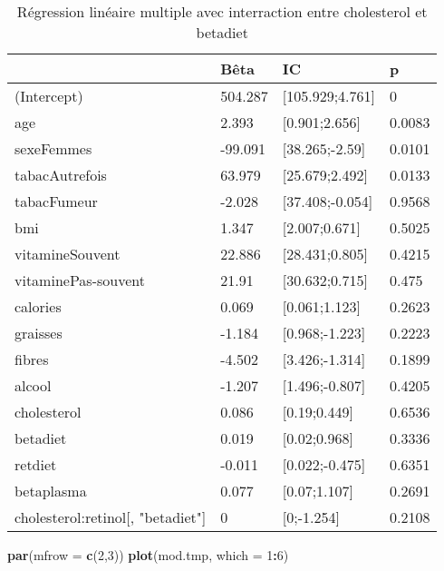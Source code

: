 \documentclass[]{article}
\newenvironment{Shaded}{\begin{snugshade}}{\end{snugshade}}
\newcommand{\KeywordTok}[1]{\textcolor[rgb]{0.13,0.29,0.53}{\textbf{#1}}}
\newcommand{\DataTypeTok}[1]{\textcolor[rgb]{0.13,0.29,0.53}{#1}}
\newcommand{\DecValTok}[1]{\textcolor[rgb]{0.00,0.00,0.81}{#1}}
\newcommand{\OperatorTok}[1]{\textcolor[rgb]{0.81,0.36,0.00}{\textbf{#1}}}
\newcommand{\NormalTok}[1]{#1}
\begin{document}
\begin{table}

\caption{\label{tab:unnamed-chunk-78}Régression linéaire multiple avec interraction entre cholesterol et betadiet}
\centering
\begin{tabular}[t]{l|l|l|l}
\hline
  & Bêta & IC & p\\
\hline
\rowcolor[HTML]{BBD2E1}  (Intercept) & 504.287 & [105.929;4.761] & 0\\
\hline
age & 2.393 & [0.901;2.656] & 0.0083\\
\hline
\rowcolor[HTML]{BBD2E1}  sexeFemmes & -99.091 & [38.265;-2.59] & 0.0101\\
\hline
tabacAutrefois & 63.979 & [25.679;2.492] & 0.0133\\
\hline
\rowcolor[HTML]{BBD2E1}  tabacFumeur & -2.028 & [37.408;-0.054] & 0.9568\\
\hline
bmi & 1.347 & [2.007;0.671] & 0.5025\\
\hline
\rowcolor[HTML]{BBD2E1}  vitamineSouvent & 22.886 & [28.431;0.805] & 0.4215\\
\hline
vitaminePas-souvent & 21.91 & [30.632;0.715] & 0.475\\
\hline
\rowcolor[HTML]{BBD2E1}  calories & 0.069 & [0.061;1.123] & 0.2623\\
\hline
graisses & -1.184 & [0.968;-1.223] & 0.2223\\
\hline
\rowcolor[HTML]{BBD2E1}  fibres & -4.502 & [3.426;-1.314] & 0.1899\\
\hline
alcool & -1.207 & [1.496;-0.807] & 0.4205\\
\hline
\rowcolor[HTML]{BBD2E1}  cholesterol & 0.086 & [0.19;0.449] & 0.6536\\
\hline
betadiet & 0.019 & [0.02;0.968] & 0.3336\\
\hline
\rowcolor[HTML]{BBD2E1}  retdiet & -0.011 & [0.022;-0.475] & 0.6351\\
\hline
betaplasma & 0.077 & [0.07;1.107] & 0.2691\\
\hline
\rowcolor[HTML]{BBD2E1}  cholesterol:retinol[, "betadiet"] & 0 & [0;-1.254] & 0.2108\\
\hline
\end{tabular}
\end{table}

\begin{Shaded}
\begin{Highlighting}[]
\KeywordTok{par}\NormalTok{(}\DataTypeTok{mfrow =} \KeywordTok{c}\NormalTok{(}\DecValTok{2}\NormalTok{,}\DecValTok{3}\NormalTok{))}
\KeywordTok{plot}\NormalTok{(mod.tmp, }\DataTypeTok{which =} \DecValTok{1}\OperatorTok{:}\DecValTok{6}\NormalTok{)}
\end{Highlighting}
\end{Shaded}
\end{document}

